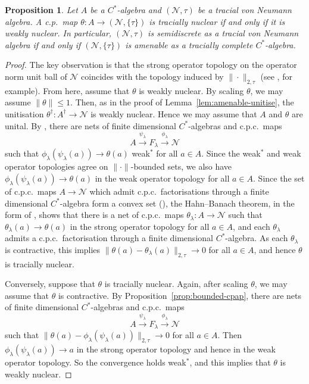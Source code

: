 \documentclass[a4paper,11pt]{amsart}
\newtheorem{proposition}[theorem]{Proposition}
\theoremstyle{definition}
\numberwithin{equation}{section}
\numberwithin{theorem}{section}
\begin{document}
\begin{proposition}\label{prop:tracialnuc=weaknuc}
Let $A$ be a $C^*$-algebra and $(\mathcal N,\tau)$ be a tracial von Neumann algebra.  A c.p.\ map $\theta\colon A\to (\mathcal N,\{\tau\})$ is tracially nuclear if and only if it is weakly nuclear. In particular, $(\mathcal N,\tau)$ is semidiscrete as a tracial von Neumann algebra if and only if $(\mathcal N,\{\tau\})$ is {}amenable as a tracially complete $C^*$-algebra.
\end{proposition}
\begin{proof}
The key observation is that the strong operator topology on the operator norm unit ball of $\mathcal N$ coincides with the topology induced by $\|\cdot\|_{2, \tau}$ (see \cite[Proposition III.2.2.17]{Bl06}, for example).  From here, assume that $\theta$ is weakly nuclear.  
By scaling $\theta$, we may assume $\|\theta\| \leq 1$.  Then, as in the proof of Lemma~\ref{lem:amenable-unitise}, the unitisation $\theta^\dag \colon A^\dag \rightarrow \mathcal N$ 
is weakly nuclear.  Hence we may assume that $A$ and $\theta$ are unital.  By \cite[Proposition~3.8.2]{Br08}, there are nets of finite dimensional $C^*$-algebras and c.p.c.\ maps
\begin{equation}
    A \overset{\psi_\lambda}{\longrightarrow} F_\lambda \overset{\phi_\lambda}{\longrightarrow} \mathcal N
\end{equation}
such that $\phi_\lambda(\psi_\lambda(a)) \rightarrow \theta(a)$ weak$^*$ for all $a \in A$.  Since the weak$^*$ and weak operator topologies agree on $\|\cdot\|$-bounded sets, we also have $\phi_\lambda(\psi_\lambda(a)) \rightarrow \theta(a)$ in the weak operator topology for all  $a \in A$.  Since the set of c.p.c.\ maps $A \rightarrow \mathcal N$ 
which admit c.p.c.\ factorisations through a finite dimensional $C^*$-algebra form a convex set (\cite[Lemma~2.3.6 and Remark~2.3.7]{Br08}), the Hahn--Banach theorem, in the form of \cite[Lemma~3.8.1]{Br08}, shows that there is a net of c.p.c.\ maps $\theta_\lambda \colon A \rightarrow \mathcal N$ such that 
$\theta_\lambda(a) \rightarrow \theta(a)$ in the strong operator topology for all $a \in A$, and each $\theta_\lambda$ admits a c.p.c.\ factorisation through a finite dimensional $C^*$-algebra.  
As each $\theta_\lambda$ is contractive, this implies $\|\theta(a) - \theta_\lambda(a)\|_{2, \tau} \rightarrow 0$ for all $a \in A$, and hence $\theta$ is tracially nuclear.

Conversely, suppose that $\theta$ is tracially nuclear. Again, after scaling $\theta$, we may assume that $\theta$ is contractive.  By Proposition~\ref{prop:bounded-cpap}, there are nets of finite dimensional $C^*$-algebras and c.p.c.\ maps
\begin{equation}
    A \overset{\psi_\lambda}{\longrightarrow} F_\lambda \overset{\phi_\lambda}{\longrightarrow} \mathcal N
\end{equation}
such that $\|\theta(a) - \phi_\lambda(\psi_\lambda(a))\|_{2, \tau} \rightarrow 0$ for all $a \in A$.  Then $\phi_\lambda(\psi_\lambda(a)) \rightarrow a$ in the strong operator topology and hence in the weak operator topology.  So the convergence holds weak$^*$, and this implies that $\theta$ is weakly nuclear.
\end{proof}
\end{document}
